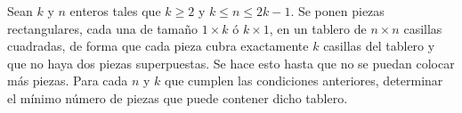 Sean $k$ y $n$ enteros tales que $k \ge 2$ y $k \le n \le 2k - 1$. Se ponen piezas rectangulares,
cada una de tamaño $1 \times k$ ó $k \times 1$, en un tablero de $n \times n$ casillas cuadradas, de forma que cada
pieza cubra exactamente $k$ casillas del tablero y que no haya dos piezas superpuestas. Se hace esto
hasta que no se puedan colocar más piezas. Para cada $n$ y $k$ que cumplen las condiciones anteriores,
determinar el mínimo número de piezas que puede contener dicho tablero.